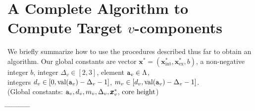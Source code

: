 \documentclass[12pt]{article}
\newcommand{\intt}{\mathrm{int}}
\newcommand{\ex}{\mathrm{ex}}
\newcommand{\ta}{{\tt a}}
\newcommand{\x}{\pmb{x}}
\newcommand{\1}{\pmb{1}}
\newcommand{\0}{\pmb{0}}
\newcommand{\val}{\mathrm{val}}
\begin{document}
\section{A Complete Algorithm to Compute Target $v$-components}

We briefly summarize how to use the procedures described thus far 
to obtain an algorithm.
Our global constants are 
vector $\x^* = (\x^*_{\intt}, \x^*_{\ex}, b)$, 
a non-negative integer $b$,
integer  
$\Delta_v \in [2, 3]$,  
element
$\ta_v \in \Lambda$,  \\
integers
$d_v \in [0, \val(\ta_v) - \Delta_v-1]$, 
$m_v \in [d_{v}, \val(\ta_v) - \Delta_v-1]$. \bigskip\\
%
(Global constants: 
$\ta_v, d_v, m_v, \Delta_v, \x^*_v$, ${\rm core~height}$)
\begin{tabbing}
%
\hspace{3mm} \= \hspace{3mm} \= \hspace{3mm} \= \hspace{3mm} \= %
\hspace{3mm} \= \hspace{3mm} \= \hspace{3mm} \= \hspace{3mm} \= %
\hspace{3mm} \= \hspace{3mm} \= \hspace{3mm} \= \hspace{3mm}  \kill
%
                


\end{tabbing}
\end{document}
